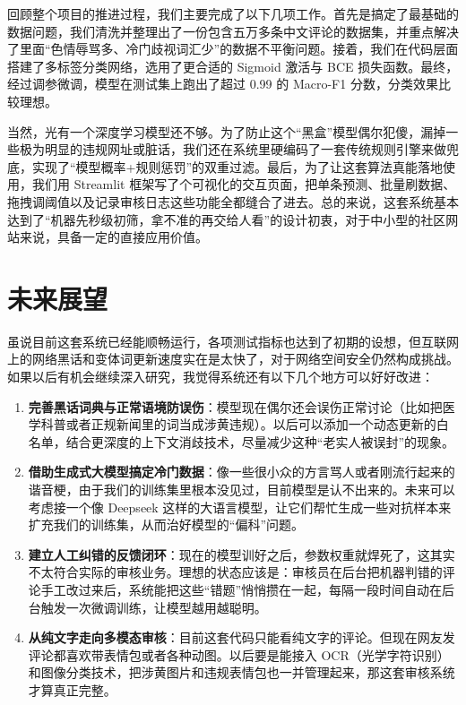 \documentclass[twoside]{thesis-cls-Miya} %
\begin{document}
回顾整个项目的推进过程，我们主要完成了以下几项工作。首先是搞定了最基础的数据问题，我们清洗并整理出了一份包含五万多条中文评论的数据集，并重点解决了里面“色情辱骂多、冷门歧视词汇少”的数据不平衡问题。接着，我们在代码层面搭建了多标签分类网络，选用了更合适的 Sigmoid 激活与 BCE 损失函数。最终，经过调参微调，模型在测试集上跑出了超过 0.99 的 Macro-F1 分数，分类效果比较理想。

当然，光有一个深度学习模型还不够。为了防止这个“黑盒”模型偶尔犯傻，漏掉一些极为明显的违规网址或脏话，我们还在系统里硬编码了一套传统规则引擎来做兜底，实现了“模型概率+规则惩罚”的双重过滤。最后，为了让这套算法真能落地使用，我们用 Streamlit 框架写了个可视化的交互页面，把单条预测、批量刷数据、拖拽调阈值以及记录审核日志这些功能全都缝合了进去。总的来说，这套系统基本达到了“机器先秒级初筛，拿不准的再交给人看”的设计初衷，对于中小型的社区网站来说，具备一定的直接应用价值。

\section{未来展望}
虽说目前这套系统已经能顺畅运行，各项测试指标也达到了初期的设想，但互联网上的网络黑话和变体词更新速度实在是太快了，对于网络空间安全仍然构成挑战。如果以后有机会继续深入研究，我觉得系统还有以下几个地方可以好好改进：

\begin{enumerate}
	\def\labelenumi{\arabic{enumi}.}
	\item
	\textbf{完善黑话词典与正常语境防误伤}：模型现在偶尔还会误伤正常讨论（比如把医学科普或者正规新闻里的词当成涉黄违规）。以后可以添加一个动态更新的白名单，结合更深度的上下文消歧技术，尽量减少这种“老实人被误封”的现象。
	\item
	\textbf{借助生成式大模型搞定冷门数据}：像一些很小众的方言骂人或者刚流行起来的谐音梗，由于我们的训练集里根本没见过，目前模型是认不出来的。未来可以考虑接一个像 Deepseek 这样的大语言模型，让它们帮忙生成一些对抗样本来扩充我们的训练集，从而治好模型的“偏科”问题。
	\item
	\textbf{建立人工纠错的反馈闭环}：现在的模型训好之后，参数权重就焊死了，这其实不太符合实际的审核业务。理想的状态应该是：审核员在后台把机器判错的评论手工改过来后，系统能把这些“错题”悄悄攒在一起，每隔一段时间自动在后台触发一次微调训练，让模型越用越聪明。
	\item
	\textbf{从纯文字走向多模态审核}：目前这套代码只能看纯文字的评论。但现在网友发评论都喜欢带表情包或者各种动图。以后要是能接入 OCR（光学字符识别）和图像分类技术，把涉黄图片和违规表情包也一并管理起来，那这套审核系统才算真正完整。
\end{enumerate}
\end{document}
